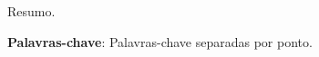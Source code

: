 \setlength{\absparsep}{18pt} %
\begin{resumo}
\vspace{\onelineskip}
Resumo.

\vspace{\onelineskip}
\noindent\textbf{Palavras-chave}: Palavras-chave separadas por ponto.
\end{resumo}